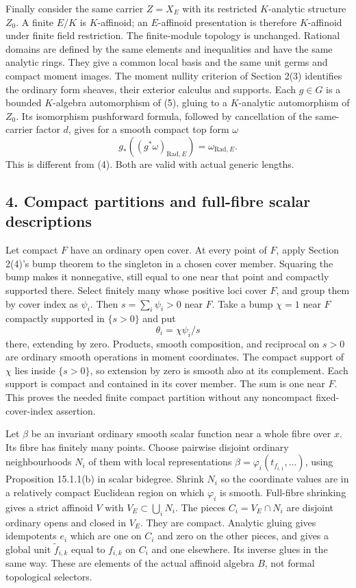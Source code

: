 \documentclass[
  11pt,
]{article}
\begin{document}
Finally consider the same carrier \(Z=X_E\) with its restricted
\(K\)-analytic structure \(Z_0\). A finite \(E/K\) is \(K\)-affinoid; an
\(E\)-affinoid presentation is therefore \(K\)-affinoid under finite
field restriction. The finite-module topology is unchanged. Rational
domains are defined by the same elements and inequalities and have the
same analytic rings. They give a common local basis and the same unit
germs and compact moment images. The moment nullity criterion of Section
2(3) identifies the ordinary form sheaves, their exterior calculus and
supports. Each \(g\in G\) is a bounded \(K\)-algebra automorphism of
(5), gluing to a \(K\)-analytic automorphism of \(Z_0\). Its isomorphism
pushforward formula, followed by cancellation of the same-carrier factor
\(d\), gives for a smooth compact top form \(\omega\) \[
             g_*((g^*\omega)_{\mathrm{Rad},E})
                            =\omega_{\mathrm{Rad},E}.    \tag{6}
\] This is different from (4). Both are valid with actual generic
lengths.

\subsection{4. Compact partitions and full-fibre scalar
descriptions}\label{compact-partitions-and-full-fibre-scalar-descriptions}

Let compact \(F\) have an ordinary open cover. At every point of \(F\),
apply Section 2(4)'s bump theorem to the singleton in a chosen cover
member. Squaring the bump makes it nonnegative, still equal to one near
that point and compactly supported there. Select finitely many whose
positive loci cover \(F\), and group them by cover index as \(\psi_i\).
Then \(s=\sum_i\psi_i>0\) near \(F\). Take a bump \(\chi=1\) near \(F\)
compactly supported in \(\{s>0\}\) and put \[
                \theta_i=\chi\psi_i/s                  \tag{7}
\] there, extending by zero. Products, smooth composition, and
reciprocal on \(s>0\) are ordinary smooth operations in moment
coordinates. The compact support of \(\chi\) lies inside \(\{s>0\}\), so
extension by zero is smooth also at its complement. Each support is
compact and contained in its cover member. The sum is one near \(F\).
This proves the needed finite compact partition without any noncompact
fixed-cover-index assertion.

Let \(\beta\) be an invariant ordinary smooth scalar function near a
whole fibre over \(x\). Its fibre has finitely many points. Choose
pairwise disjoint ordinary neighbourhoods \(N_i\) of them with local
representations \(\beta=\varphi_i(t_{f_{i,1}},\ldots)\), using Proposition
15.1.1(b) in scalar bidegree. Shrink \(N_i\) so the coordinate values are in a relatively
compact Euclidean region on which \(\varphi_i\) is smooth. Full-fibre
shrinking gives a strict affinoid \(V\) with \(V_E\subset\bigcup_iN_i\).
The pieces \(C_i=V_E\cap N_i\) are disjoint ordinary opens and closed in
\(V_E\). They are compact. Analytic gluing gives idempotents \(e_i\)
which are one on \(C_i\) and zero on the other pieces, and gives a
global unit \(\widetilde f_{i,k}\) equal to \(f_{i,k}\) on \(C_i\) and
one elsewhere. Its inverse glues in the same way. These are elements of
the actual affinoid algebra \(B\), not formal topological selectors.
\end{document}
